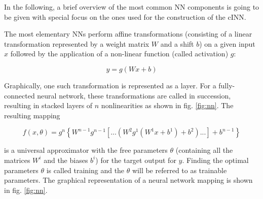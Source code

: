 In the following, a brief overview of the most common NN components is going to be given with special focus on the ones used for the construction of the cINN.

The most elementary NNs perform affine transformations (consisting of a linear transformation represented by a weight matrix $W$ and a shift $b$) on a given input $x$ followed by the application of a non-linear function (called activation) $g$:

\begin{equation*}
	y = g(Wx+b)
\end{equation*}

Graphically, one such transformation is represented as a layer. For a fully-connected neural network, these transformations are called in succession, resulting in stacked layers of $n$ nonlinearities as shown in fig. \ref{fig:nn}. The resulting mapping

\begin{equation*}
	f(x, \theta) = g^n\left\{W^{n-1}g^{n-1}\left[ ... \left(W^2g^1(W^1x+b^1)+b^2\right)...\right]+b^{n-1}\right\}
\end{equation*}

is a universal approximator with the free parameters $\theta$ (containing all the matrices $W^i$ and the biases $b^i$) for the target output for $y$. Finding the optimal parameters $\theta$ is called training and the $\theta$ will be referred to as trainable parameters. The graphical representation of a neural network mapping is shown in fig. \ref{fig:nn}.


